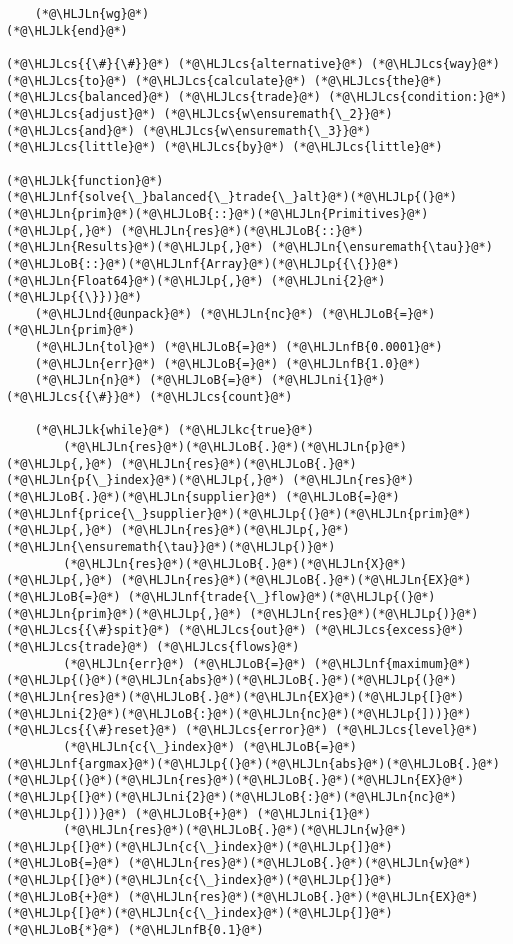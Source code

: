 \documentclass[12pt,a4paper]{article}
\newcommand{\HLJLk}[1]{\textcolor[RGB]{148,91,176}{\textbf{#1}}}
\newcommand{\HLJLkc}[1]{\textcolor[RGB]{59,151,46}{\textit{#1}}}
\newcommand{\HLJLn}[1]{#1}
\newcommand{\HLJLnd}[1]{\textcolor[RGB]{214,102,97}{#1}}
\newcommand{\HLJLnf}[1]{\textcolor[RGB]{66,102,213}{#1}}
\newcommand{\HLJLnfB}[1]{\textcolor[RGB]{59,151,46}{#1}}
\newcommand{\HLJLni}[1]{\textcolor[RGB]{59,151,46}{#1}}
\newcommand{\HLJLoB}[1]{\textcolor[RGB]{102,102,102}{\textbf{#1}}}
\newcommand{\HLJLp}[1]{#1}
\newcommand{\HLJLcs}[1]{\textcolor[RGB]{153,153,119}{\textit{#1}}}
\begin{document}
\begin{lstlisting}
    (*@\HLJLn{wg}@*)
(*@\HLJLk{end}@*)

(*@\HLJLcs{{\#}{\#}}@*) (*@\HLJLcs{alternative}@*) (*@\HLJLcs{way}@*) (*@\HLJLcs{to}@*) (*@\HLJLcs{calculate}@*) (*@\HLJLcs{the}@*) (*@\HLJLcs{balanced}@*) (*@\HLJLcs{trade}@*) (*@\HLJLcs{condition:}@*) (*@\HLJLcs{adjust}@*) (*@\HLJLcs{w\ensuremath{\_2}}@*) (*@\HLJLcs{and}@*) (*@\HLJLcs{w\ensuremath{\_3}}@*) (*@\HLJLcs{little}@*) (*@\HLJLcs{by}@*) (*@\HLJLcs{little}@*)

(*@\HLJLk{function}@*) (*@\HLJLnf{solve{\_}balanced{\_}trade{\_}alt}@*)(*@\HLJLp{(}@*)(*@\HLJLn{prim}@*)(*@\HLJLoB{::}@*)(*@\HLJLn{Primitives}@*)(*@\HLJLp{,}@*) (*@\HLJLn{res}@*)(*@\HLJLoB{::}@*)(*@\HLJLn{Results}@*)(*@\HLJLp{,}@*) (*@\HLJLn{\ensuremath{\tau}}@*)(*@\HLJLoB{::}@*)(*@\HLJLnf{Array}@*)(*@\HLJLp{{\{}}@*)(*@\HLJLn{Float64}@*)(*@\HLJLp{,}@*) (*@\HLJLni{2}@*)(*@\HLJLp{{\}})}@*)
    (*@\HLJLnd{@unpack}@*) (*@\HLJLn{nc}@*) (*@\HLJLoB{=}@*) (*@\HLJLn{prim}@*)
    (*@\HLJLn{tol}@*) (*@\HLJLoB{=}@*) (*@\HLJLnfB{0.0001}@*)
    (*@\HLJLn{err}@*) (*@\HLJLoB{=}@*) (*@\HLJLnfB{1.0}@*)
    (*@\HLJLn{n}@*) (*@\HLJLoB{=}@*) (*@\HLJLni{1}@*) (*@\HLJLcs{{\#}}@*) (*@\HLJLcs{count}@*)

    (*@\HLJLk{while}@*) (*@\HLJLkc{true}@*)
        (*@\HLJLn{res}@*)(*@\HLJLoB{.}@*)(*@\HLJLn{p}@*)(*@\HLJLp{,}@*) (*@\HLJLn{res}@*)(*@\HLJLoB{.}@*)(*@\HLJLn{p{\_}index}@*)(*@\HLJLp{,}@*) (*@\HLJLn{res}@*)(*@\HLJLoB{.}@*)(*@\HLJLn{supplier}@*) (*@\HLJLoB{=}@*) (*@\HLJLnf{price{\_}supplier}@*)(*@\HLJLp{(}@*)(*@\HLJLn{prim}@*)(*@\HLJLp{,}@*) (*@\HLJLn{res}@*)(*@\HLJLp{,}@*) (*@\HLJLn{\ensuremath{\tau}}@*)(*@\HLJLp{)}@*)
        (*@\HLJLn{res}@*)(*@\HLJLoB{.}@*)(*@\HLJLn{X}@*)(*@\HLJLp{,}@*) (*@\HLJLn{res}@*)(*@\HLJLoB{.}@*)(*@\HLJLn{EX}@*) (*@\HLJLoB{=}@*) (*@\HLJLnf{trade{\_}flow}@*)(*@\HLJLp{(}@*)(*@\HLJLn{prim}@*)(*@\HLJLp{,}@*) (*@\HLJLn{res}@*)(*@\HLJLp{)}@*) (*@\HLJLcs{{\#}spit}@*) (*@\HLJLcs{out}@*) (*@\HLJLcs{excess}@*) (*@\HLJLcs{trade}@*) (*@\HLJLcs{flows}@*)
        (*@\HLJLn{err}@*) (*@\HLJLoB{=}@*) (*@\HLJLnf{maximum}@*)(*@\HLJLp{(}@*)(*@\HLJLn{abs}@*)(*@\HLJLoB{.}@*)(*@\HLJLp{(}@*)(*@\HLJLn{res}@*)(*@\HLJLoB{.}@*)(*@\HLJLn{EX}@*)(*@\HLJLp{[}@*)(*@\HLJLni{2}@*)(*@\HLJLoB{:}@*)(*@\HLJLn{nc}@*)(*@\HLJLp{]))}@*) (*@\HLJLcs{{\#}reset}@*) (*@\HLJLcs{error}@*) (*@\HLJLcs{level}@*)
        (*@\HLJLn{c{\_}index}@*) (*@\HLJLoB{=}@*) (*@\HLJLnf{argmax}@*)(*@\HLJLp{(}@*)(*@\HLJLn{abs}@*)(*@\HLJLoB{.}@*)(*@\HLJLp{(}@*)(*@\HLJLn{res}@*)(*@\HLJLoB{.}@*)(*@\HLJLn{EX}@*)(*@\HLJLp{[}@*)(*@\HLJLni{2}@*)(*@\HLJLoB{:}@*)(*@\HLJLn{nc}@*)(*@\HLJLp{]))}@*) (*@\HLJLoB{+}@*) (*@\HLJLni{1}@*)
        (*@\HLJLn{res}@*)(*@\HLJLoB{.}@*)(*@\HLJLn{w}@*)(*@\HLJLp{[}@*)(*@\HLJLn{c{\_}index}@*)(*@\HLJLp{]}@*) (*@\HLJLoB{=}@*) (*@\HLJLn{res}@*)(*@\HLJLoB{.}@*)(*@\HLJLn{w}@*)(*@\HLJLp{[}@*)(*@\HLJLn{c{\_}index}@*)(*@\HLJLp{]}@*) (*@\HLJLoB{+}@*) (*@\HLJLn{res}@*)(*@\HLJLoB{.}@*)(*@\HLJLn{EX}@*)(*@\HLJLp{[}@*)(*@\HLJLn{c{\_}index}@*)(*@\HLJLp{]}@*) (*@\HLJLoB{*}@*) (*@\HLJLnfB{0.1}@*)


\end{lstlisting}
\end{document}
